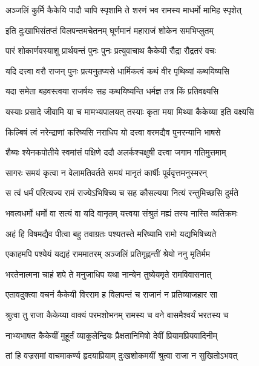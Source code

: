 \twolineshloka
{अञ्जलिं कुर्मि कैकेयि पादौ चापि स्पृशामि ते}
{शरणं भव रामस्य माधर्मो मामिह स्पृशेत्} %

\twolineshloka
{इति दुःखाभिसंतप्तं विलपन्तमचेतनम्}
{घूर्णमानं महाराजं शोकेन समभिप्लुतम्} %

\twolineshloka
{पारं शोकार्णवस्याशु प्रार्थयन्तं पुनः पुनः}
{प्रत्युवाचाथ कैकेयी रौद्रा रौद्रतरं वचः} %

\twolineshloka
{यदि दत्त्वा वरौ राजन् पुनः प्रत्यनुतप्यसे}
{धार्मिकत्वं कथं वीर पृथिव्यां कथयिष्यसि} %

\twolineshloka
{यदा समेता बहवस्त्वया राजर्षयः सह}
{कथयिष्यन्ति धर्मज्ञ तत्र किं प्रतिवक्ष्यसि} %

\twolineshloka
{यस्याः प्रसादे जीवामि या च मामभ्यपालयत्}
{तस्याः कृता मया मिथ्या कैकेय्या इति वक्ष्यसि} %

\twolineshloka
{किल्बिषं त्वं नरेन्द्राणां करिष्यसि नराधिप}
{यो दत्त्वा वरमद्यैव पुनरन्यानि भाषसे} %

\twolineshloka
{शैब्यः श्येनकपोतीये स्वमांसं पक्षिणे ददौ}
{अलर्कश्चक्षुषी दत्त्वा जगाम गतिमुत्तमाम्} %

\twolineshloka
{सागरः समयं कृत्वा न वेलामतिवर्तते}
{समयं मानृतं कार्षीः पूर्ववृत्तमनुस्मरन्} %

\twolineshloka
{स त्वं धर्मं परित्यज्य रामं राज्येऽभिषिच्य च}
{सह कौसल्यया नित्यं रन्तुमिच्छसि दुर्मते} %

\twolineshloka
{भवत्वधर्मो धर्मो वा सत्यं वा यदि वानृतम्}
{यत्त्वया संश्रुतं मह्यं तस्य नास्ति व्यतिक्रमः} %

\twolineshloka
{अहं हि विषमद्यैव पीत्वा बहु तवाग्रतः}
{पश्यतस्ते मरिष्यामि रामो यद्यभिषिच्यते} %

\twolineshloka
{एकाहमपि पश्येयं यद्यहं राममातरम्}
{अञ्जलिं प्रतिगृह्णन्तीं श्रेयो ननु मृतिर्मम} %

\twolineshloka
{भरतेनात्मना चाहं शपे ते मनुजाधिप}
{यथा नान्येन तुष्येयमृते रामविवासनात्} %

\twolineshloka
{एतावदुक्त्वा वचनं कैकेयी विरराम ह}
{विलपन्तं च राजानं न प्रतिव्याजहार सा} %

\twolineshloka
{श्रुत्वा तु राजा कैकेय्या वाक्यं परमशोभनम्}
{रामस्य च वने वासमैश्वर्यं भरतस्य च} %

\twolineshloka
{नाभ्यभाषत कैकेयीं मुहूर्तं व्याकुलेन्द्रियः}
{प्रैक्षतानिमिषो देवीं प्रियामप्रियवादिनीम्} %

\twolineshloka
{तां हि वज्रसमां वाचमाकर्ण्य हृदयाप्रियाम्}
{दुःखशोकमयीं श्रुत्वा राजा न सुखितोऽभवत्} %

